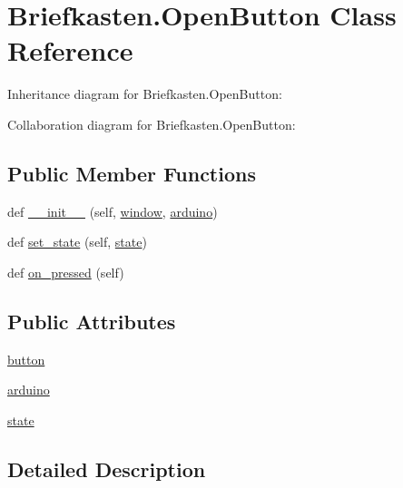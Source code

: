 \hypertarget{class_briefkasten_1_1_open_button}{}\section{Briefkasten.\+Open\+Button Class Reference}
\label{class_briefkasten_1_1_open_button}


Inheritance diagram for Briefkasten.\+Open\+Button\+:


Collaboration diagram for Briefkasten.\+Open\+Button\+:
\subsection*{Public Member Functions}
\begin{DoxyCompactItemize}
\item 
def \mbox{\hyperlink{class_briefkasten_1_1_open_button_ae575ed28ea29c28d1c3f9c22e1e0c023}{\+\_\+\+\_\+init\+\_\+\+\_\+}} (self, \mbox{\hyperlink{namespace_briefkasten_a23e95fd1ba50315d778c20df7e8a0d39}{window}}, \mbox{\hyperlink{class_briefkasten_1_1_open_button_a70007e7338090aec181fe4559ddb49e1}{arduino}})
\item 
def \mbox{\hyperlink{class_briefkasten_1_1_open_button_a568a81c3f6db33b5312c8ae940e43550}{set\+\_\+state}} (self, \mbox{\hyperlink{class_briefkasten_1_1_open_button_a8be5568f0d5b5fb9871e29275f423cf5}{state}})
\item 
def \mbox{\hyperlink{class_briefkasten_1_1_open_button_a8f6db25bcdf765089dde8e85540a0c86}{on\+\_\+pressed}} (self)
\end{DoxyCompactItemize}
\subsection*{Public Attributes}
\begin{DoxyCompactItemize}
\item 
\mbox{\hyperlink{class_briefkasten_1_1_open_button_af1347704af62dc891b4623234e97866d}{button}}
\item 
\mbox{\hyperlink{class_briefkasten_1_1_open_button_a70007e7338090aec181fe4559ddb49e1}{arduino}}
\item 
\mbox{\hyperlink{class_briefkasten_1_1_open_button_a8be5568f0d5b5fb9871e29275f423cf5}{state}}
\end{DoxyCompactItemize}


\subsection{Detailed Description}



